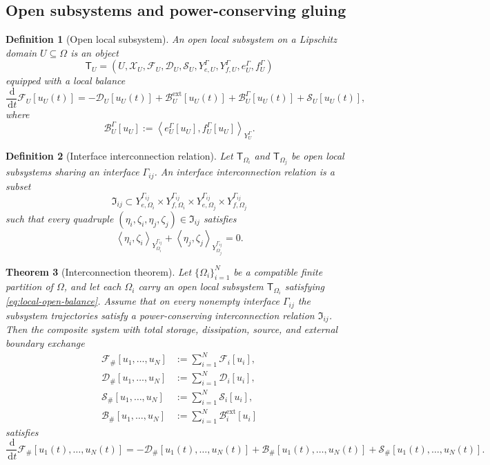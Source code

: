 \documentclass[10pt,a4paper]{amsart}
\newtheorem{theorem}{Theorem}[section]
\newtheorem{definition}[theorem]{Definition}
\newcommand{\Om}{\Omega}
\newcommand{\dd}{\,\mathrm{d}}
\newcommand{\F}{\mathcal{F}}
\newcommand{\X}{\mathcal{X}}
\newcommand{\Diss}{\mathcal{D}}
\newcommand{\Bnd}{\mathcal{B}}
\newcommand{\Src}{\mathcal{S}}
\newcommand{\pair}[2]{\left\langle #1,#2\right\rangle}
\begin{document}
\subsection{Open subsystems and power-conserving gluing}

\begin{definition}[Open local subsystem]
An \emph{open local subsystem} on a Lipschitz domain \(U\subseteq \Om\) is an object
\[
\mathsf{T}_U
=
(U,\X_U,\F_U,\Diss_U,\Src_U,
Y_{e,U}^{\Gamma},Y_{f,U}^{\Gamma},e_U^\Gamma,f_U^\Gamma)
\]
equipped with a local balance
\begin{equation}\label{eq:local-open-balance}
\frac{\dd}{\dd t}\F_U[u_U(t)]
=
-\Diss_U[u_U(t)]
+\Bnd_U^{\mathrm{ext}}[u_U(t)]
+\Bnd_U^{\Gamma}[u_U(t)]
+\Src_U[u_U(t)],
\end{equation}
where
\[
\Bnd_U^{\Gamma}[u_U]:=
\pair{e_U^\Gamma[u_U]}{f_U^\Gamma[u_U]}_{Y_U^\Gamma}.
\]
\end{definition}

\begin{definition}[Interface interconnection relation]
Let \(\mathsf{T}_{\Om_i}\) and \(\mathsf{T}_{\Om_j}\) be open local subsystems sharing an
interface \(\Gamma_{ij}\). An \emph{interface interconnection relation} is a subset
\[
\mathfrak{I}_{ij}
\subset
Y_{e,\Om_i}^{\Gamma_{ij}}\times Y_{f,\Om_i}^{\Gamma_{ij}}
\times
Y_{e,\Om_j}^{\Gamma_{ij}}\times Y_{f,\Om_j}^{\Gamma_{ij}}
\]
such that every quadruple
\((\eta_i,\zeta_i,\eta_j,\zeta_j)\in \mathfrak{I}_{ij}\) satisfies
\begin{equation}\label{eq:power-ij}
\pair{\eta_i}{\zeta_i}_{Y_{\Om_i}^{\Gamma_{ij}}}
+
\pair{\eta_j}{\zeta_j}_{Y_{\Om_j}^{\Gamma_{ij}}}
=0.
\end{equation}
\end{definition}


\begin{theorem}[Interconnection theorem]\label{thm:interconnection}
Let \(\{\Om_i\}_{i=1}^N\) be a compatible finite partition of \(\Om\), and let each
\(\Om_i\) carry an open local subsystem \(\mathsf{T}_{\Om_i}\) satisfying
\eqref{eq:local-open-balance}. Assume that on every nonempty interface \(\Gamma_{ij}\)
the subsystem trajectories satisfy a power-conserving interconnection relation
\(\mathfrak{I}_{ij}\). Then the composite system with total storage, dissipation,
source, and external boundary exchange
\begin{align}
\F_\#[u_1,\dots,u_N] &:= \sum_{i=1}^N \F_i[u_i],\label{eq:Fsharp-local}\\
\Diss_\#[u_1,\dots,u_N] &:= \sum_{i=1}^N \Diss_i[u_i],\label{eq:Dsharp-local}\\
\Src_\#[u_1,\dots,u_N] &:= \sum_{i=1}^N \Src_i[u_i],\label{eq:Ssharp-local}\\
\Bnd_\#[u_1,\dots,u_N] &:= \sum_{i=1}^N \Bnd_i^{\mathrm{ext}}[u_i]\label{eq:Bsharp-local}
\end{align}
satisfies
\begin{equation}\label{eq:sharp-local-balance}
\frac{\dd}{\dd t}\F_\#[u_1(t),\dots,u_N(t)]
=
-\Diss_\#[u_1(t),\dots,u_N(t)]
+\Bnd_\#[u_1(t),\dots,u_N(t)]
+\Src_\#[u_1(t),\dots,u_N(t)].
\end{equation}
\end{theorem}
\end{document}
